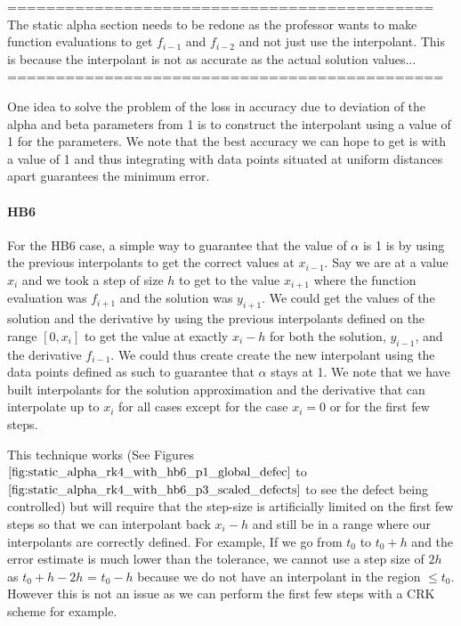 \documentclass{article}
\begin{document}
============================================
The static alpha section needs to be redone as the professor wants to make function
evaluations to get $f_{i-1}$ and $f_{i-2}$ and not just use the interpolant.
This is because the interpolant is not as accurate as the actual solution values...
=============================================

One idea to solve the problem of the loss in accuracy due to deviation of the alpha and beta parameters from 1 is to construct the interpolant using a value of 1 for the parameters. We note that the best accuracy we can hope to get is with a value of 1 and thus integrating with data points situated at uniform distances apart guarantees the minimum error.

\paragraph{HB6} For the HB6 case, a simple way to guarantee that the value of $\alpha$ is 1 is by using the previous interpolants to get the correct values at $x_{i - 1}$. Say we are at a value $x_i$ and we took a step of size $h$ to get to the value $x_{i + 1}$ where the function evaluation was $f_{i + 1}$ and the solution was $y_{i + 1}$. We could get the values of the solution and the derivative by using the previous interpolants defined on the range $[0, x_i]$ to get the value at exactly $x_i - h$ for both the solution, $y_{i - 1}$, and the derivative $f_{i - 1}$.  We could thus create create the new interpolant using the data points defined as such to guarantee that $\alpha$ stays at 1. We note that we have built interpolants for the solution approximation and the derivative that  can interpolate up to $x_i$ for all cases except for the case $x_i = 0$ or for the first few steps.

This technique works (See Figures $\ref{fig:static_alpha_rk4_with_hb6_p1_global_defec}$ to $\ref{fig:static_alpha_rk4_with_hb6_p3_scaled_defects}$ to see the defect being controlled) but will require that the step-size is artificially limited on the first few steps so that we can interpolant back $x_i - h$ and still be in a range where our interpolants are correctly defined. For example, If we go from $t_0$ to $t_0 + h$ and the error estimate is much lower than the tolerance, we cannot use a step size of $2h$ as $t_0 + h - 2h$ = $t_0-h$ because we do not have an interpolant in the region $\leq t_0$. However this is not an issue as we can perform the first few steps with a CRK scheme for example.
\end{document}
